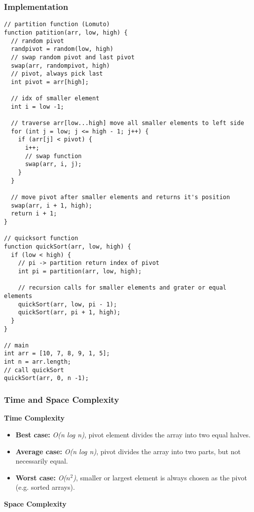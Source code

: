\subsubsection*{Implementation}

\begin{lstlisting}[style=general]
// partition function (Lomuto)
function patition(arr, low, high) {
  // random pivot
  randpivot = random(low, high)
  // swap random pivot and last pivot
  swap(arr, randompivot, high)
  // pivot, always pick last
  int pivot = arr[high];

  // idx of smaller element
  int i = low -1;

  // traverse arr[low...high] move all smaller elements to left side
  for (int j = low; j <= high - 1; j++) {
    if (arr[j] < pivot) {
      i++;
      // swap function
      swap(arr, i, j);
    }
  }

  // move pivot after smaller elements and returns it's position
  swap(arr, i + 1, high);
  return i + 1;
}

// quicksort function
function quickSort(arr, low, high) {
  if (low < high) {
    // pi -> partition return index of pivot
    int pi = partition(arr, low, high);

    // recursion calls for smaller elements and grater or equal elements
    quickSort(arr, low, pi - 1);
    quickSort(arr, pi + 1, high);
  }
}

// main
int arr = [10, 7, 8, 9, 1, 5];
int n = arr.length;
// call quickSort
quickSort(arr, 0, n -1);
\end{lstlisting}

\subsubsection*{Time and Space Complexity}

\textbf{Time Complexity}

\begin{itemize}
  \item \textbf{Best case:} \textit{O(n log n)}, pivot element divides the array into two equal halves.
  \item \textbf{Average case:} \emph{O(n log n)}, pivot divides the array into two parts, but not necessarily equal.
  \item \textbf{Worst case:} \textit{O($n^2$)}, smaller or largest element is always chosen as the pivot (e.g. sorted arrays).
\end{itemize}

\textbf{Space Complexity}

